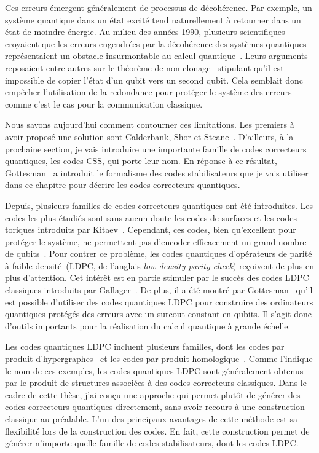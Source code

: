 Ces erreurs émergent généralement de processus de décohérence.
Par exemple,
un système quantique dans un état excité tend naturellement à retourner dans un état de moindre énergie.
Au milieu des années 1990,
plusieurs scientifiques croyaient que
les erreurs engendrées par la décohérence des systèmes quantiques
représentaient un obstacle insurmontable au calcul quantique~\cite{unruh_maintaining_1995, palma_quantum_1996, landauer_is_1995, chuang_quantum_1995}.
Leurs arguments reposaient entre autres sur le théorème de non-clonage~\cite{wootters_single_1982}
stipulant qu'il est impossible de copier l'état d'un qubit vers un second qubit.
Cela semblait donc empêcher l'utilisation de la redondance pour 
protéger le système des erreurs comme c'est le cas pour la communication classique.

Nous savons aujourd'hui comment contourner ces limitations. 
Les premiers à avoir proposé une solution sont Calderbank, Shor et Steane~\cite{calderbank_good_1996, steane_multiple-particle_nodate}.
D'ailleurs, à la prochaine section,
je vais introduire une importante famille de codes correcteurs quantiques, les codes CSS, qui porte leur nom.
En réponse à ce résultat, Gottesman~\cite{gottesman_stabilizer_1997} a introduit le formalisme des codes stabilisateurs
que je vais utiliser dans ce chapitre pour décrire les codes correcteurs quantiques.

Depuis,
plusieurs familles de codes correcteurs quantiques ont été introduites.
Les codes les plus étudiés sont sans aucun doute les codes de surfaces et 
les codes toriques introduits par Kitaev~\cite{kitaev_fault-tolerant_2003}.
Cependant,
ces codes, bien qu'excellent pour protéger le système,
ne permettent pas d'encoder efficacement un grand nombre de qubits~\cite{bravyi_tradeoffs_2010}.
Pour contrer ce problème,
les codes quantiques d'opérateurs de parité à faible 
densité~(LDPC, de l'anglais \textit{low-density parity-check})
reçoivent de plus en plus d'attention.
Cet intérêt est en partie stimuler par le succès des codes LDPC classiques introduits
par Gallager~\cite{gallager_low-density_1962}.
De plus, il a été montré par Gottesman~\cite{gottesman_fault-tolerant_2013}
qu'il est possible d'utiliser des codes quantiques LDPC pour 
construire des ordinateurs quantiques protégés des erreurs avec 
un surcout constant en qubits.
Il s'agit donc d'outils importants pour la réalisation du calcul quantique à grande échelle.

Les codes quantiques LDPC incluent plusieurs familles,
dont les codes par produit d'hypergraphes~\cite{tillich_quantum_2014}
et les codes par produit homologique~\cite{bravyi_homological_2014}.
Comme l'indique le nom de ces exemples,
les codes quantiques LDPC sont généralement obtenus par le produit 
de structures associées à des codes correcteurs classiques.
Dans le cadre de cette thèse,
j'ai conçu une approche qui permet plutôt de générer des codes correcteurs quantiques
directement,
sans avoir recours à une construction classique au préalable.
L'un des principaux avantages de cette méthode est sa flexibilité 
lors de la construction des codes.
En fait,
cette construction permet de générer n'importe quelle famille de codes stabilisateurs,
dont les codes LDPC.

